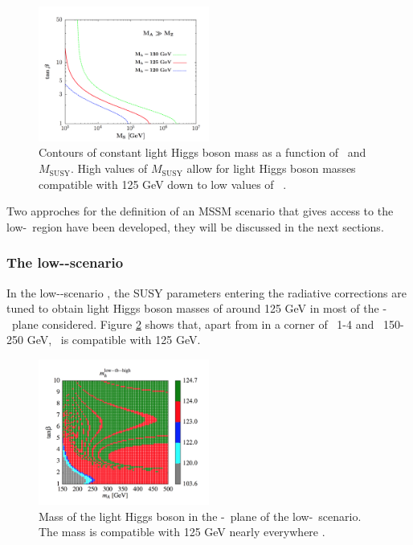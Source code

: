 \begin{figure}[h!]
\begin{center}
\includegraphics[width=0.5\textwidth]{./Theory/Figures/tanb_accessibility.png}
\end{center}
\caption{Contours of constant light Higgs boson mass as a function of \tanb~and $M_{\text{SUSY}}$.
High values of $M_{\text{SUSY}}$ allow for light Higgs boson masses compatible with
125 GeV down to low values of \tanb~\cite{hMSSM-2}.}
\label{fig:tanb_accessibility}
\end{figure}


Two approches for the definition of an MSSM scenario that gives
access to the low-\tanb~region have been developed, they will be
discussed in the next sections.

\subsubsection{The low-\tanb-scenario}
\label{sec:theory_BSM_model_lowtb}
In the low-\tanb-scenario \cite{Hein-low-tb-high,MSSM-lowtanb}, the SUSY parameters entering
the radiative corrections are tuned to obtain light 
Higgs boson masses of around 125 GeV in most of the \mA-\tanb~plane considered.
Figure \ref{fig:lowtbhigh_mh} shows that, apart from in a corner of \tanb~1-4 and 
\mA~150-250 GeV, \mh~is compatible with 125 GeV.

\begin{figure}[h!]
\begin{center}
\includegraphics[width=0.5\textwidth]{./Theory/Figures/mh_lowtbhigh.png}
\end{center}
\caption{Mass of the light Higgs boson in the \mA-\tanb~plane of the low-\tanb~scenario.
The mass is compatible with 125 GeV nearly everywhere \cite{MSSM-lowtanb}.}
\label{fig:lowtbhigh_mh}
\end{figure}

